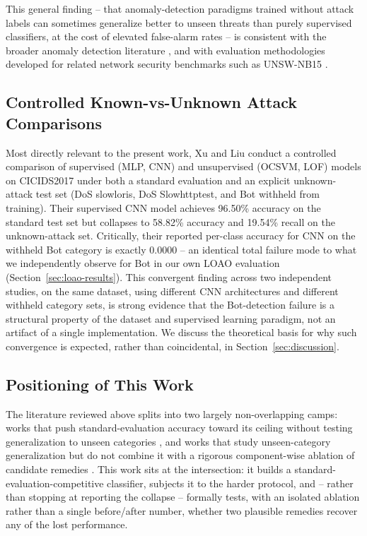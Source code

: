 \documentclass[11pt]{article}
\begin{document}
This general finding -- that anomaly-detection paradigms trained without attack labels can
sometimes generalize better to unseen threats than purely supervised classifiers, at the cost of
elevated false-alarm rates -- is consistent with the broader anomaly detection literature
\cite{chandola2009}, and with evaluation methodologies developed for related network security
benchmarks such as UNSW-NB15 \cite{moustafa2016}.

\subsection{Controlled Known-vs-Unknown Attack Comparisons}

Most directly relevant to the present work, Xu and Liu \cite{xu2025} conduct a controlled comparison
of supervised (MLP, CNN) and unsupervised (OCSVM, LOF) models on CICIDS2017 under both a standard
evaluation and an explicit unknown-attack test set (DoS slowloris, DoS Slowhttptest, and Bot
withheld from training). Their supervised CNN model achieves 96.50\% accuracy on the standard test
set but collapses to 58.82\% accuracy and 19.54\% recall on the unknown-attack set. Critically, their
reported per-class accuracy for CNN on the withheld Bot category is exactly $0.0000$ -- an identical
total failure mode to what we independently observe for Bot in our own LOAO evaluation
(Section~\ref{sec:loao-results}). This convergent finding across two independent studies, on the
same dataset, using different CNN architectures and different withheld category sets, is strong
evidence that the Bot-detection failure is a structural property of the dataset and supervised
learning paradigm, not an artifact of a single implementation. We discuss the theoretical basis for
why such convergence is expected, rather than coincidental, in Section~\ref{sec:discussion}.

\subsection{Positioning of This Work}

The literature reviewed above splits into two largely non-overlapping camps: works that push
standard-evaluation accuracy toward its ceiling without testing generalization to unseen categories
\cite{afraji2025,kumar2023}, and works that study unseen-category generalization but do not combine
it with a rigorous component-wise ablation of candidate remedies
\cite{hindy2020,xu2025}. This work sits at the intersection: it builds a standard-evaluation-competitive
classifier, subjects it to the harder protocol, and -- rather than stopping at reporting the
collapse -- formally tests, with an isolated ablation rather than a single before/after number,
whether two plausible remedies recover any of the lost performance.
\end{document}
